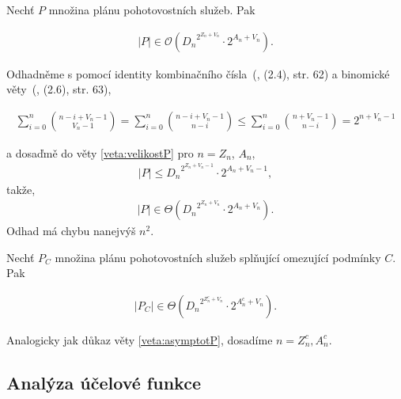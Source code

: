 \begin{veta}\label{veta:asymptotP}
  Nechť $P$ množina plánu pohotovostních služeb. Pak 

  \begin{align*}
    |P| \in \mathcal{O} \left ({D_n}^{2^{Z_n + V_n}} \cdot 2^{A_n + V_n} \right ).
  \end{align*}
\end{veta}

\begin{dukaz}
  Odhadněme s pomocí identity kombinačního čísla~(\citet{Diskretka}, (2.4), str. 62) a binomické věty~(\citet{Diskretka}, (2.6), str. 63),

  \begin{align*}
    \sum_{i=0}^{n} \binom{n - i + V_n - 1}{V_n - 1} =
    \sum_{i=0}^{n} \binom{n - i + V_n - 1}{n - i} \leq
    \sum_{i=0}^{n} \binom{n + V_n - 1}{n - i} =
    2^{n + V_n - 1}
  \end{align*}

  a dosaďmě do věty \ref{veta:velikostP} pro $n = Z_n$, $A_n$,
  \begin{align*}
    |P| \leq {D_n}^{2^{Z_n + V_n - 1}} \cdot 2^{A_n + V_n - 1},
  \end{align*}
  takže,
  \begin{align*}
    |P| \in \Theta({D_n}^{2^{Z_n + V_n}} \cdot 2^{A_n + V_n}).
  \end{align*}
  Odhad má chybu nanejvýš $n^2$.
\end{dukaz}

\begin{veta}\label{veta:PCvelikost}
  Nechť $P_C$ množina plánu pohotovostních služeb splňující omezující podmínky $C$. Pak 

  \begin{align*}
    |P_C| \in \Theta({D_n}^{2^{Z^c_n + V_n}} \cdot 2^{A^c_n + V_n}).
  \end{align*}
\end{veta}

\begin{dukaz}
  Analogicky jak důkaz věty \ref{veta:asymptotP}, dosadíme $n = Z^c_n, A^c_n$.
\end{dukaz}

\subsection{Analýza účelové funkce}\label{kap:analVicF}

